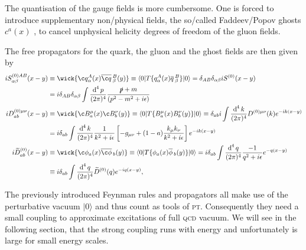 \documentclass[../../index.tex]{subfiles}
\begin{document}
The quantisation of the gauge fields is more cumbersome. One is forced to
introduce supplementary non\-/physical fields, the so\-/called Faddeev\-/Popov
ghosts \(c^a(x)\) \cite{Faddeev1967}, to cancel unphysical helicity degrees of
freedom of the gluon fields.

The free propagators for the quark, the gluon and the ghost fields are then
given by
\begin{equation}
  \begin{split}
    i S^{(0)AB}_{\alpha\beta}(x-y) &\equiv \wick{ \c q_\alpha^A(x) \anti{\c
        q}_\beta^B(y)} \equiv \langle 0 \vert T \{ q_\alpha^A(x)
    \anti{q}_\beta^B \} \vert 0 \rangle
    = \delta_{AB} \delta_{\alpha\beta} i S^{(0)}(x-y) \\
    &= i \delta_{AB}\delta_{\alpha\beta}\int \fdif{p} \frac{\slashed p + m}{(p^2 - m^2 + i\epsilon)}\\
    i D^{(0)\mu\nu}_{ab}(x-y) &\equiv \wick{ \c B_a^\mu(x) \c B_b^\nu(y)} \equiv
    \langle 0 \vert T \{ B_a^\mu(x) B_b^\nu(y) \} \vert 0 \rangle
    \equiv \delta_{ab}i \int \fdif{k} D^{(0)\mu\nu}(k) e^{-ik(x-y)} \\
    &= i \delta_{ab} \int \fdif{k} \frac{1}{k^2+i\epsilon} \left[ -g_{\mu\nu} + (1-a) \frac{k_\mu k_\nu}{k^2+i\epsilon} \right] e^{-ik(x-y)} \\
    i \widetilde{D}_{ab}^{(0)}(x-y) & \equiv \wick{\c \phi_a(x) \anti{\c
        \phi}_b(y)} \equiv \langle 0 \vert T\{ \phi_a(x) \anti{\phi}_b(y) \}
    \vert 0 \rangle
    = i \delta_{ab} \int \fdif{q} \frac{-1}{q^2 + i\epsilon} e^{-q(x-y)} \\
    &\equiv i \delta_{ab} \int \fdif{q} \widetilde{D}^{(0)}(q)
    e^{-iq(x-y)},
  \end{split}
\end{equation}

The previously introduced Feynman rules and propagators all make use of the
perturbative vacuum \(\vert 0 \rangle\) and thus count as tools of
\textsc{pt}. Consequently they need a small coupling to approximate excitations
of full \textsc{qcd} vacuum. We will see in the following section, that the
strong coupling runs with energy and unfortunately is large for small energy
scales.
\end{document}
